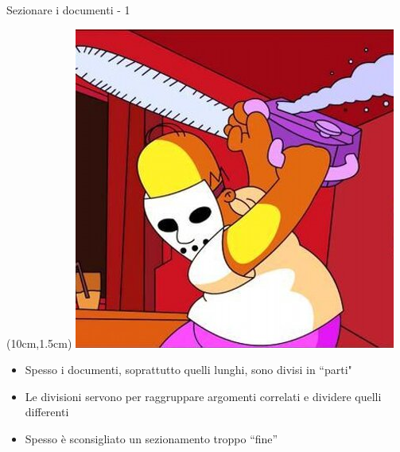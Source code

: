 \begin{frame}{Sezionare i documenti - 1}

\begin{textblock*}{2cm}(10cm,1.5cm)
	\includegraphics[scale=0.15]{res/images/sezionamento}
\end{textblock*}

\vspace*{20pt}

\begin{itemize}

	\item Spesso i documenti, soprattutto quelli lunghi, sono divisi in ``parti"
	\item Le divisioni servono per raggruppare argomenti correlati e dividere
	quelli differenti
	\item Spesso è sconsigliato un sezionamento troppo ``fine''

\end{itemize}

\end{frame}

